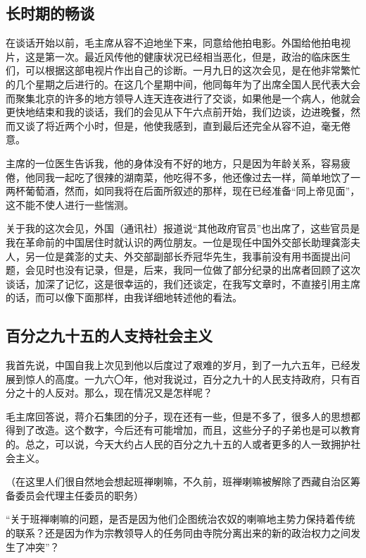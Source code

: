\subsection{长时期的畅谈}

在谈话开始以前，毛主席从容不迫地坐下来，同意给他拍电影。外国给他拍电视片，这是第一次。最近风传他的健康状况已经相当恶化，但是，政治的临床医生们，可以根据这部电视片作出自己的诊断。一月九日的这次会见，是在他非常繁忙的几个星期之后进行的。在这几个星期中间，他同每年为了出席全国人民代表大会而聚集北京的许多的地方领导人连天连夜进行了交谈，如果他是一个病人，他就会更快地结束和我的谈话，我们的会见从下午六点前开始，我们边谈，边进晚餐，然而又谈了将近两个小时，但是，他使我感到，直到最后还完全从容不迫，毫无倦意。

主席的一位医生告诉我，他的身体没有不好的地方，只是因为年龄关系，容易疲倦，他同我一起吃了很辣的湖南菜，他吃得不多，他还像过去一样，简单地饮了一两杯葡萄酒，然而，如同我将在后面所叙述的那样，现在已经准备“同上帝见面”，这不能不使人进行一些惴测。

关于我的这次会见，外国（通讯社）报道说“其他政府官员”也出席了，这些官员是我在革命前的中国居住时就认识的两位朋友。一位是现任中国外交部长助理龚澎夫人，另一位是龚澎的丈夫、外交部副部长乔冠华先生，我事前没有用书面提出问题，会见时也没有记录，但是，后来，我同一位做了部分纪录的出席者回顾了这次谈话，加深了记忆，这是很幸运的，我们还谈定，在我写文章时，不直接引用主席的话，而可以像下面那样，由我详细地转述他的看法。

\subsection{百分之九十五的人支持社会主义}

我首先说，中国自我上次见到他以后度过了艰难的岁月，到了一九六五年，已经发展到惊人的高度。一九六〇年，他对我说过，百分之九十的人民支持政府，只有百分之十的人反对。那么，现在情况又是怎样呢？

毛主席回答说，蒋介石集团的分子，现在还有一些，但是不多了，很多人的思想都得到了改造。这个数字，今后还有可能增加，而且，这些分子的子弟也是可以教育的。总之，可以说，今天大约占人民的百分之九十五的人或者更多的人一致拥护社会主义。

（在这里人们很自然地会想起班禅喇嘛，不久前，班禅喇嘛被解除了西藏自治区筹备委员会代理主任委员的职务）

“关于班禅喇嘛的问题，是否是因为他们企图统治农奴的喇嘛地主势力保持着传统的联系？还是因为作为宗教领导人的任务同由寺院分离出来的新的政治权力之间发生了冲突”？


